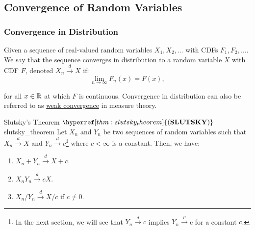 \subsection{Convergence of Random Variables}
\newcommand{\SLUTSKY}{\hyperref[thm:slutsky_theorem]{(\mathrm{{\bf SLUTSKY}})}}
\newcommand{\PORT}{\hyperref[thm:portmanteau_theorem]{(\mathrm{{\bf PORTMANTEAU}})}}

\subsubsection{Convergence in Distribution}
\begin{definition}
    Given a sequence of real-valued random variables $X_1, X_2, \dots$ with CDFs $F_1, F_2, \dots$. We say that the sequence converges in distribution to a random variable $X$ with CDF $F$, denoted $X_n\xrightarrow{d}X$ if:
    \begin{equation}
        \lim_{n\to\infty}F_n(x) = F(x),
    \end{equation}

    \noindent for all $x\in\mathbb{R}$ at which $F$ is continuous. Convergence in distribution can also be referred to as \underline{weak convergence} in measure theory.
\end{definition}

\begin{theorem}{Slutsky's Theorem $\SLUTSKY$}{slutsky_theorem}
    Let $X_n$ and $Y_n$ be two sequences of random variables such that $X_n\xrightarrow{d}X$ and $Y_n\xrightarrow{d} c$\footnote{In the next section, we will see that $Y_n\xrightarrow{d}c$ implies $Y_n\xrightarrow{p}$c for a constant $c$.} where $c<\infty$ is a constant. Then, we have:
    \begin{enumerate}
        \item $X_n + Y_n \xrightarrow{d} X + c$.
        \item $X_nY_n \xrightarrow{d} cX$.
        \item $X_n/Y_n \xrightarrow{d} X/c$ if $c \ne 0$. 
    \end{enumerate} 
\end{theorem} 

